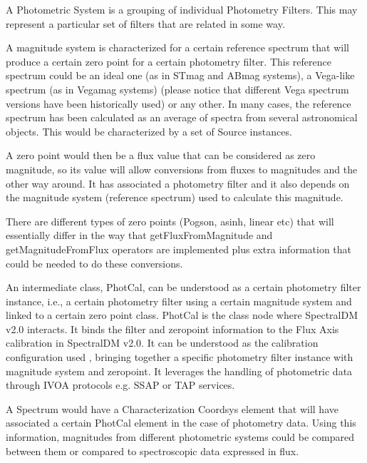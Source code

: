 \documentclass[11pt,a4paper]{ivoa}
\begin{document}
A Photometric System is a grouping of individual Photometry Filters. This may represent a particular set of filters that are related in some way.
\par

A magnitude system is characterized for a certain reference spectrum that will produce a certain zero point for a certain photometry filter. This reference spectrum could be an ideal one (as in STmag and ABmag systems), a Vega-like spectrum (as in Vegamag systems) (please notice that different Vega spectrum versions have been historically used) or any other. In many cases, the reference spectrum has been calculated as an average of spectra from several astronomical objects. This would be characterized by a set of Source instances.
\par

A zero point would then be a flux value that can be considered as zero magnitude, so its value will allow conversions from fluxes to magnitudes and the other way around. It has associated a photometry filter and it also depends on the magnitude system (reference spectrum) used to calculate this magnitude.
\par

There are different types of zero points (Pogson, asinh, linear etc) that will essentially differ in the way that getFluxFromMagnitude and getMagnitudeFromFlux operators are implemented plus extra information that could be needed to do these conversions.
\par

An intermediate class, PhotCal, can be understood as a certain photometry filter instance, i.e., a certain photometry filter using a certain magnitude system and linked to a certain zero point class. PhotCal is the class node where SpectralDM v2.0 interacts. It binds the filter and zeropoint information to the Flux Axis calibration in SpectralDM v2.0. It can be understood as the calibration configuration used , bringing together a specific photometry filter instance with magnitude system and zeropoint. It leverages the handling of photometric data through IVOA protocols e.g. SSAP or TAP services.
\par

A Spectrum would have a Characterization Coordsys element that will have associated a certain PhotCal element in the case of photometry data. Using this information, magnitudes from different photometric systems could be compared between them or compared to spectroscopic data expressed in flux.
\par
\end{document}
